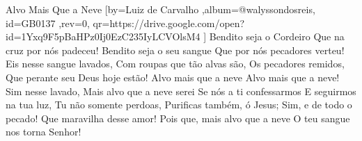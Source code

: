 \beginsong
{Alvo Mais Que a Neve %
}[by={Luiz de Carvalho %
},album={@walyssondosreis},
id={GB0137 %
},rev={0}, %
qr={https://drive.google.com/open?id=1Yxq9F5pBaHPz0Ij0EzC235IyLCVOlsM4 %
}]
\beginverse*
Bendito seja o Cordeiro
Que na cruz por nós padeceu!
Bendito seja o seu sangue
Que por nós pecadores verteu!
Eis nesse sangue lavados,
Com roupas que tão alvas são,
Os pecadores remidos,
Que perante seu Deus hoje estão!
\endverse
\beginchorus
Alvo mais que a neve
Alvo mais que a neve!
Sim nesse lavado,
Mais alvo que a neve serei
\endchorus
\beginverse*
Se nós a ti confessarmos
E seguirmos na tua luz,
Tu não somente perdoas,
Purificas também, ó Jesus;
Sim, e de todo o pecado!
Que maravilha desse amor!
Pois que, mais alvo que a neve
O teu sangue nos torna Senhor!
\endverse


